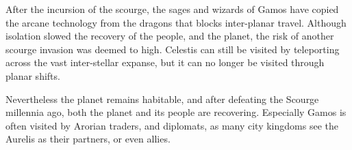 After the incursion of the scourge, the sages and wizards of Gamos have copied
the arcane technology from the dragons that blocks inter-planar travel. Although
isolation slowed the recovery of the people, and the planet, the risk of
another scourge invasion was deemed to high. Celestis can still be visited by
teleporting across the vast inter-stellar expanse, but it can no longer be
visited through planar shifts.

Nevertheless the planet remains habitable, and after defeating the Scourge
millennia ago, both the planet and its people are recovering. Especially Gamos
is often visited by Arorian traders, and diplomats, as many city kingdoms see
the Aurelis as their partners, or even allies.
